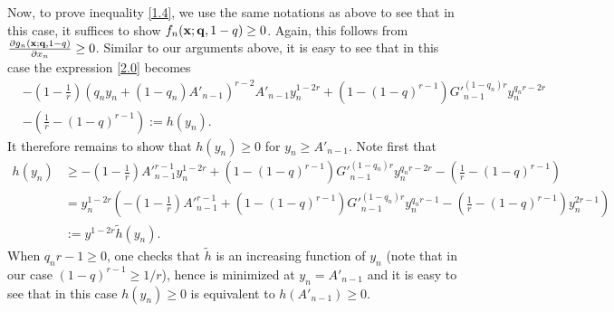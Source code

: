\documentclass[11pt]{amsart}
\numberwithin{equation}{section}
\theoremstyle{definition}
\theoremstyle{remark}
\begin{document}
   Now, to prove inequality \eqref{1.4},  we use
   the same notations as above to see that in this case, it suffices to show $f_n({\bf x}; {\bf q}, 1-q) \geq
   0$. Again, this follows from $\frac {\partial g_n({\bf x}; {\bf q}, 1-q)}{\partial x_n} \geq
   0$. Similar to our arguments above, it is easy to see that in this case the expression \eqref{2.0} becomes
\begin{align*}
  &  -(1-\frac {1}{r})(q_ny_n+(1-q_n)A'_{n-1})^{r-2}A'_{n-1}y^{1-2r}_n+(1-(1-q)^{r-1}){G'}^{(1-	q_n)r}_{n-1}y^{q_nr-2r}_n \\
& -(\frac 1r-(1-q)^{r-1}) :=h(y_n).
\end{align*}
   It therefore remains to show that $h(y_n) \geq 0$ for $y_n \geq A'_{n-1}$.  Note first that
\begin{align*}
   h(y_n)  & \geq -(1-\frac {1}{r}){A'}^{r-1}_{n-1}y^{1-2r}_n+(1-(1-q)^{r-1}){G'}^{(1-	q_n)r}_{n-1}y^{q_nr-2r}_n  -(\frac 1r-(1-q)^{r-1}) \\
 & = y^{1-2r}_n \left ( -(1-\frac {1}{r}){A'}^{r-1}_{n-1}+(1-(1-q)^{r-1}){G'}^{(1-	q_n)r}_{n-1}y^{q_nr-1}_n  -(\frac 1r-(1-q)^{r-1})y^{2r-1}_n \right ) \\
& :=y^{1-2r} \tilde{h}(y_n).
\end{align*}
   When $q_nr-1 \geq 0$, one checks that $\tilde{h}$ is an increasing function of $y_n$ (note that in our case $(1-q)^{r-1} \geq 1/r$), hence is minimized at $y_n=A'_{n-1}$ and it is easy to see that in this case $h(y_n) \geq 0$ is equivalent to $h(A'_{n-1}) \geq 0$.
\end{document}
